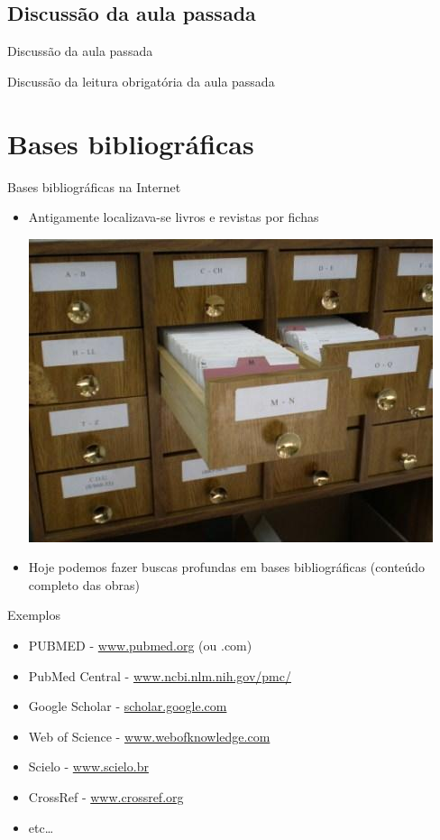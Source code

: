 \documentclass{beamer}
\begin{document}
\subsection{Discussão da aula passada}

\begin{frame}{Discussão da aula passada}
  \begin{block}{}
    Discussão da leitura obrigatória da aula passada
  \end{block}
\end{frame}

\section{Bases bibliográficas}

\begin{frame}{Bases bibliográficas na Internet}
  \begin{itemize}
  \item Antigamente localizava-se livros e revistas por fichas
    \begin{center}
      \includegraphics[height=.45\textheight]{Busca/fichas}
    \end{center}

  \item Hoje podemos fazer buscas profundas em bases bibliográficas
    (conteúdo completo das obras)
  \end{itemize}
\end{frame}

\begin{frame}{Exemplos}
  \begin{itemize}
  \item \alert{PUBMED} - \url{www.pubmed.org} (ou .com)
  \item \alert{PubMed Central} - \url{www.ncbi.nlm.nih.gov/pmc/}
  \item \alert{Google Scholar} - \url{scholar.google.com}
  \item Web of Science - \url{www.webofknowledge.com}
  \item Scielo - \url{www.scielo.br}
  \item CrossRef - \url{www.crossref.org}
  \item etc\ldots
  \end{itemize}
\end{frame}
\end{document}
